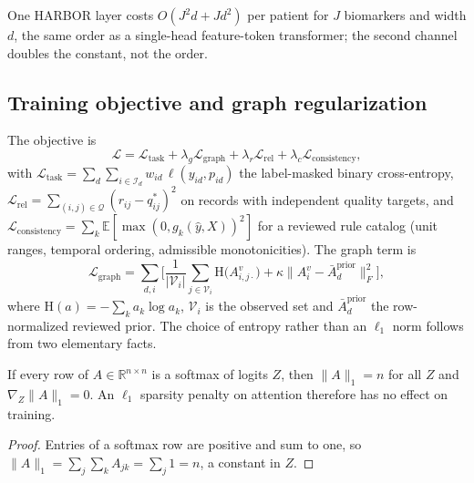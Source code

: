 \begin{proposition}[Cost]\label{prop:cost}
One HARBOR layer costs $O\!\left(J^2d+Jd^2\right)$ per patient for $J$ biomarkers and width $d$, the same order as a single-head feature-token transformer; the second channel doubles the constant, not the order.
\end{proposition}

\subsection{Training objective and graph regularization}
The objective is
\begin{equation}
\mathcal{L}=\mathcal{L}_{\mathrm{task}}+\lambda_g\mathcal{L}_{\mathrm{graph}}+\lambda_r\mathcal{L}_{\mathrm{rel}}+\lambda_c\mathcal{L}_{\mathrm{consistency}},
\end{equation}
with $\mathcal{L}_{\mathrm{task}}=\sum_d\sum_{i\in\mathcal{I}_d}w_{id}\,\ell(y_{id},p_{id})$ the label-masked binary cross-entropy, $\mathcal{L}_{\mathrm{rel}}=\sum_{(i,j)\in\mathcal{Q}}(r_{ij}-q^*_{ij})^2$ on records with independent quality targets, and $\mathcal{L}_{\mathrm{consistency}}=\sum_k\mathbb{E}[\max(0,g_k(\hat y,X))^2]$ for a reviewed rule catalog (unit ranges, temporal ordering, admissible monotonicities). The graph term is
\begin{equation}\label{eq:graphloss}
\mathcal{L}_{\mathrm{graph}}=\sum_{d,i}\Bigg[\frac{1}{|\mathcal{V}_i|}\sum_{j\in\mathcal{V}_i}\mathrm{H}\big(A^{v}_{i,j\cdot}\big)+\kappa\big\|A^{v}_{i}-\bar A^{\mathrm{prior}}_{d}\big\|_F^{2}\Bigg],
\end{equation}
where $\mathrm{H}(a)=-\sum_ka_k\log a_k$, $\mathcal{V}_i$ is the observed set and $\bar A^{\mathrm{prior}}_d$ the row-normalized reviewed prior. The choice of entropy rather than an $\ell_1$ norm follows from two elementary facts.

\begin{proposition}\label{prop:l1}
If every row of $A\in\mathbb{R}^{n\times n}$ is a softmax of logits $Z$, then $\|A\|_1=n$ for all $Z$ and $\nabla_Z\|A\|_1=0$. An $\ell_1$ sparsity penalty on attention therefore has no effect on training.
\end{proposition}
\begin{proof}
Entries of a softmax row are positive and sum to one, so $\|A\|_1=\sum_{j}\sum_k A_{jk}=\sum_j1=n$, a constant in $Z$.
\end{proof}

